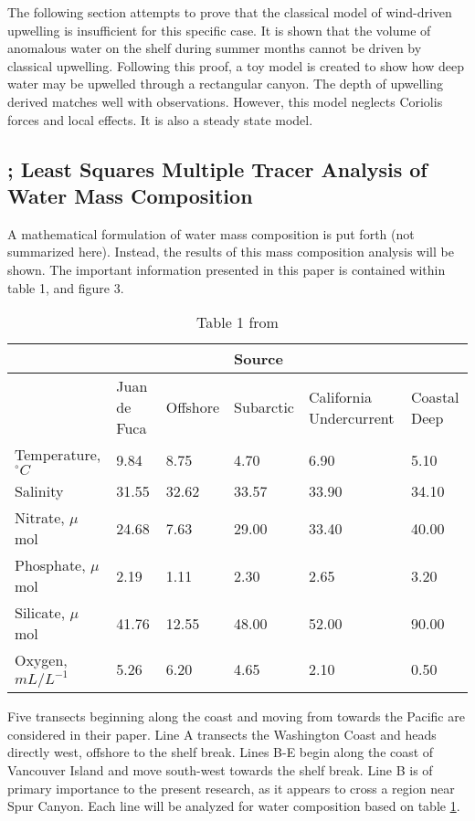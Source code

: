 \documentclass[12pt]{extreport}
\begin{document}
The following section attempts to prove that the classical model of wind-driven upwelling is insufficient for this specific case. It is shown that the volume of anomalous water on the shelf during summer months cannot be driven by classical upwelling. Following this proof, a toy model is created to show how deep water may be upwelled through a rectangular canyon. The depth of upwelling derived matches well with observations. However, this model neglects Coriolis forces and local effects. It is also a steady state model.

\subsection{\cite{mackas1987least}; Least Squares Multiple Tracer Analysis of Water Mass Composition}

A mathematical formulation of water mass composition is put forth (not summarized here). Instead, the results of this mass composition analysis will be shown. The important information presented in this paper is contained within table 1, and figure 3.

\begin{table}[h]
\centering
\begin{tabular}{p{} p{} p{} p{} p{} p{}}
\hline
& & & Source & & \\
\hline
& Juan de Fuca & Offshore & Subarctic & California Undercurrent & Coastal Deep \\
\hline
Temperature, $^\circ C$ & 9.84 & 8.75 & 4.70 & 6.90 & 5.10 \\
Salinity & 31.55 & 32.62 & 33.57 & 33.90 & 34.10 \\
Nitrate, $\mu$mol & 24.68 & 7.63 & 29.00 & 33.40 & 40.00 \\
Phosphate, $\mu$mol & 2.19 & 1.11 & 2.30 & 2.65 & 3.20 \\
Silicate, $\mu$mol & 41.76 & 12.55 & 48.00 & 52.00 & 90.00 \\
Oxygen, $mL/L^{-1}$ & 5.26 & 6.20 & 4.65 & 2.10 & 0.50 \\
\hline
\end{tabular}
\caption{Table 1 from \cite{mackas1987least}}
\label{tab:mackas}
\end{table}

Five transects beginning along the coast and moving from towards the Pacific are considered in their paper. Line A transects the Washington Coast and heads directly west, offshore to the shelf break. Lines B-E begin along the coast of Vancouver Island and move south-west towards the shelf break. Line B is of primary importance to the present research, as it appears to cross a region near Spur Canyon. Each line will be analyzed for water composition based on table \ref{tab:mackas}.
\end{document}
